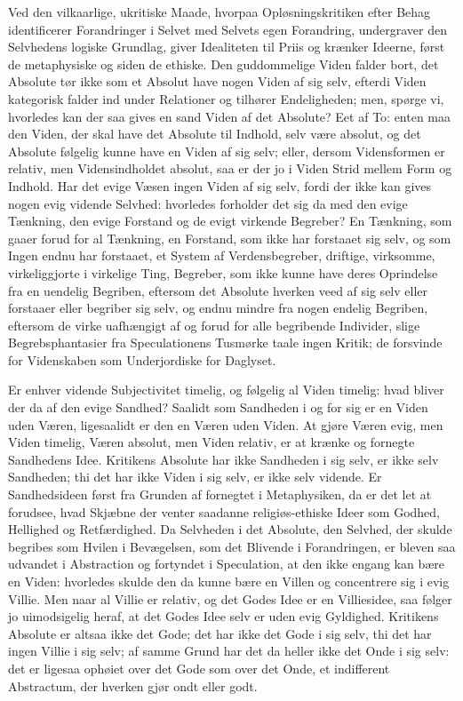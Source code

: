 \documentclass[12pt]{book}
\begin{document}
Ved den vilkaarlige, ukritiske Maade, hvorpaa Opløsningskritiken
efter Behag identificerer Forandringer i Selvet med Selvets egen
Forandring, undergraver den Selvhedens logiske Grundlag, giver
Idealiteten til Priis og krænker Ideerne, først de metaphysiske og
siden de ethiske. Den guddommelige Viden falder bort, det Absolute
tør ikke som et Absolut have nogen Viden af sig selv, efterdi Viden
kategorisk falder ind under Relationer og tilhører Endeligheden;
men, spørge vi, hvorledes kan der saa gives en sand Viden af det
Absolute? Eet af To: enten maa den Viden, der skal have det Absolute
til Indhold, selv være absolut, og det Absolute følgelig kunne have
en Viden af sig selv; eller, dersom Vidensformen er relativ, men
Vidensindholdet absolut, saa er der jo i Viden Strid mellem Form og
Indhold. Har det evige Væsen ingen Viden af sig selv, fordi der ikke
kan gives nogen evig vidende Selvhed: hvorledes forholder det sig da
med den evige Tænkning, den evige Forstand og de evigt virkende
Begreber? En Tænkning, som gaaer forud for al Tænkning, en Forstand,
som ikke har forstaaet sig selv, og som Ingen endnu har forstaaet,
et System af Verdensbegreber, driftige, virksomme, virkeliggjorte i
virkelige Ting, Begreber, som ikke kunne have deres Oprindelse fra
en uendelig Begriben, eftersom det Absolute hverken veed af sig selv
eller forstaaer eller begriber sig selv, og endnu mindre fra nogen
endelig Begriben, eftersom de virke uafhængigt af og forud for alle
begribende Individer, slige Begrebsphantasier fra Speculationens
Tusmørke taale ingen Kritik; de forsvinde for Videnskaben som
Underjordiske for Daglyset.

Er enhver vidende Subjectivitet timelig, og følgelig al Viden
timelig: hvad bliver der da af den evige Sandhed? Saalidt som
Sandheden i og for sig er en Viden
uden Væren, ligesaalidt er den en Væren uden Viden. At gjøre Væren
evig, men Viden timelig, Væren absolut, men Viden relativ, er at
krænke og fornegte Sandhedens Idee. Kritikens Absolute har ikke
Sandheden i sig selv, er ikke selv Sandheden; thi det har ikke Viden
i sig selv, er ikke selv vidende. Er Sandhedsideen først fra Grunden
af fornegtet i Metaphysiken, da er det let at forudsee, hvad
Skjæbne der venter saadanne religiøs-ethiske Ideer som Godhed,
Hellighed og Retfærdighed. Da Selvheden i det Absolute, den Selvhed,
der skulde begribes som Hvilen i Bevægelsen, som det Blivende i
Forandringen, er bleven saa udvandet i Abstraction og fortyndet i
Speculation, at den ikke engang kan bære en Viden: hvorledes skulde
den da kunne bære en Villen og concentrere sig i evig Villie. Men
naar al Villie er relativ, og det Godes Idee er en Villiesidee, saa
følger jo uimodsigelig heraf, at det Godes Idee selv er uden evig
Gyldighed. Kritikens Absolute er altsaa ikke det Gode; det har ikke
det Gode i sig selv, thi det har ingen Villie i sig selv; af samme
Grund har det da heller ikke det Onde i sig selv: det er ligesaa
ophøiet over det Gode som over det Onde, et indifferent Abstractum,
der hverken gjør ondt eller godt.
\end{document}
